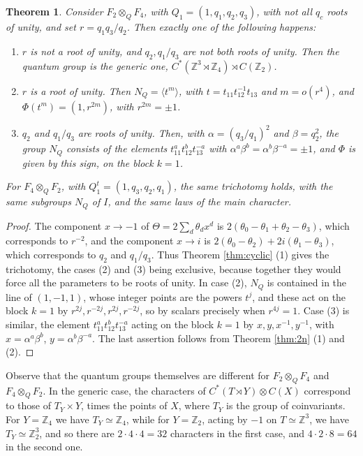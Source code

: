 \documentclass[11pt]{amsart}
\newtheorem{theorem}{Theorem}[section]
\begin{document}
\begin{theorem}\label{thm:nongen}
Consider $F_2\otimes_QF_4$, with $Q_1=(1,q_1,q_2,q_3)$, with not all $q_c$ roots of unity, and set $r=q_1q_3/q_2$. Then exactly one of the following happens:
\begin{enumerate}
\item $r$ is not a root of unity, and $q_2,q_1/q_3$ are not both roots of unity. Then the quantum group is the generic one, $C^*(\mathbb Z^3\rtimes\mathbb Z_4)\rtimes C(\mathbb Z_2)$.

\item $r$ is a root of unity. Then $N_Q=\langle t^m\rangle$, with $t=t_{11}t_{12}^{-1}t_{13}$ and $m=o(r^4)$, and $\Phi(t^m)=(1,r^{2m})$, with $r^{2m}=\pm1$.

\item $q_2$ and $q_1/q_3$ are roots of unity. Then, with $\alpha=(q_3/q_1)^2$ and $\beta=q_2^2$, the group $N_Q$ consists of the elements $t_{11}^at_{12}^bt_{13}^{-a}$ with $\alpha^a\beta^b=\alpha^b\beta^{-a}=\pm1$, and $\Phi$ is given by this sign, on the block $k=1$.
\end{enumerate}
For $F_4\otimes_QF_2$, with $Q^t_1=(1,q_3,q_2,q_1)$, the same trichotomy holds, with the same subgroups $N_Q$ of $I$, and the same laws of the main character.
\end{theorem}

\begin{proof}
The component $x\to-1$ of $\Theta=2\sum_d\theta_dx^d$ is $2(\theta_0-\theta_1+\theta_2-\theta_3)$, which corresponds to $r^{-2}$, and the component $x\to i$ is $2(\theta_0-\theta_2)+2i(\theta_1-\theta_3)$, which corresponds to $q_2$ and $q_1/q_3$. Thus Theorem \ref{thm:cyclic} (1) gives the trichotomy, the cases (2) and (3) being exclusive, because together they would force all the parameters to be roots of unity. In case (2), $N_Q$ is contained in the line of $(1,-1,1)$, whose integer points are the powers $t^j$, and these act on the block $k=1$ by $r^{2j},r^{-2j},r^{2j},r^{-2j}$, so by scalars precisely when $r^{4j}=1$. Case (3) is similar, the element $t_{11}^at_{12}^bt_{13}^{-a}$ acting on the block $k=1$ by $x,y,x^{-1},y^{-1}$, with $x=\alpha^a\beta^b$, $y=\alpha^b\beta^{-a}$. The last assertion follows from Theorem \ref{thm:2n} (1) and (2).
\end{proof}

\noindent Observe that the quantum groups themselves are different for $F_2\otimes_QF_4$ and $F_4\otimes_QF_2$. In the generic case, the characters of $C^*(T\rtimes Y)\otimes C(X)$ correspond to those of $T_Y\times Y$, times the points of $X$, where $T_Y$ is the group of coinvariants. For $Y=\mathbb Z_4$ we have $T_Y\simeq\mathbb Z_4$, while for $Y=\mathbb Z_2$, acting by $-1$ on $T\simeq\mathbb Z^3$, we have $T_Y\simeq\mathbb Z_2^3$, and so there are $2\cdot4\cdot4=32$ characters in the first case, and $4\cdot2\cdot8=64$ in the second one.
\end{document}
